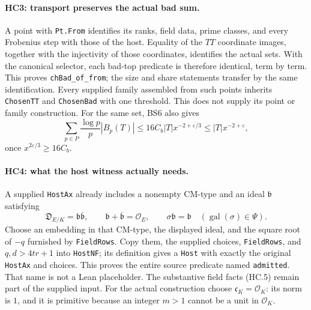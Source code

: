 \documentclass[11pt,a4paper]{article}
\numberwithin{equation}{section}
\theoremstyle{remark}\newtheorem{remark}[theorem]{Remark}
\begin{document}
\paragraph{HC3: transport preserves the actual bad sum.}
A point with \texttt{Pt.From} identifies its ranks, field data,
prime classes, and every Frobenius step with those of the host.
Equality of the $TT$ coordinate images, together with the
injectivity of those coordinates, identifies the actual sets.
With the canonical selector, each bad-top predicate is therefore
identical, term by term. This proves \texttt{chBad\_of\_from};
the size and share statements transfer by the same identification.
Every supplied family assembled from such points inherits
\texttt{ChosenTT} and \texttt{ChosenBad} with one threshold.
This does not supply its point or family construction.
For the same set, BS6 also gives
\[
 \sum_{p\in P}\frac{\log p}{p}|B_p(T)|
 \le16C_b|T|x^{-2+\varepsilon/3}
 \le |T|x^{-2+\varepsilon},                         \tag{HC.4}
\]
once $x^{2\varepsilon/3}\ge16C_b$.

\paragraph{HC4: what the host witness actually needs.}
A supplied \texttt{HostAx} already includes a nonempty CM-type and
an ideal $\mathfrak b$ satisfying
\[
 \mathfrak D_{E/K}=\mathfrak b\overline{\mathfrak b},
 \qquad \mathfrak b+\overline{\mathfrak b}=\mathcal O_E,
 \qquad \sigma\mathfrak b=\mathfrak b\quad
                   (\operatorname{gal}(\sigma)\in\Psi).       \tag{HC.5}
\]
Choose an embedding in that CM-type, the displayed ideal, and the
square root of $-q$ furnished by \texttt{FieldRows}. Copy them,
the supplied choices, \texttt{FieldRows}, and $q,d>4tr+1$ into
\texttt{HostNF}; its definition gives a \texttt{Host} with exactly
the original \texttt{HostAx} and choices. This proves the entire
source predicate named \texttt{admitted}. That name is not a
Lean placeholder. The substantive field facts (HC.5) remain
part of the supplied input. For the actual construction choose
$\mathfrak c_K=\mathcal O_K$: its norm is $1$, and it is primitive
because an integer $m>1$ cannot be a unit in $\mathcal O_K$.
\end{document}
